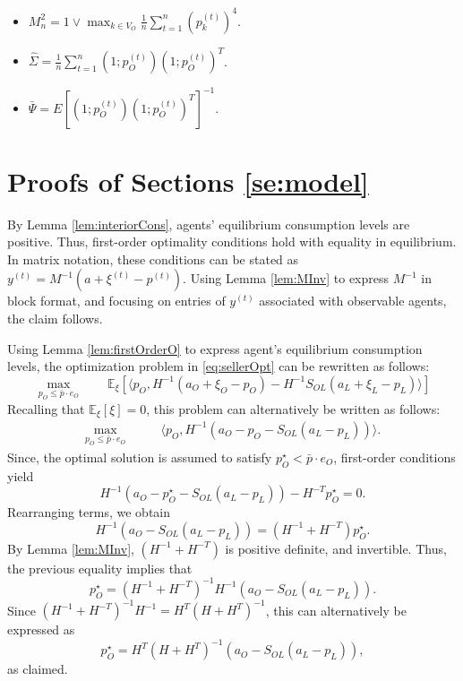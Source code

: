\documentclass[opre,nonblindrev]{informs3} %
\begin{document}
\begin{APPENDIX}{}
\begin{itemize}
    		\item 	$M_n^2= 1\vee \max_{k\in V_O}\frac{1}{n}\sum_{t=1}^n(p_k^{(t)})^4$.
    		
    		\item $\hat\Sigma= \frac{1}{n}\sum_{t=1}^n(1;p_O^{(t)})(1;p_O^{(t)})^T$.
    		
    		
    		\item $\bar \Psi=E[(1;p_O^{(t)})(1;p_O^{(t)})^T]^{-1}$.
    		
    	\end{itemize}
    	
    	
    	\section{Proofs of Sections \ref{se:model}} \label{app:proofs}
    By Lemma \ref{lem:interiorCons},
 agents' equilibrium consumption levels are positive. Thus,
 first-order optimality conditions hold  with equality in equilibrium. In matrix notation, these conditions can be stated as  ${y}^{(t)}=M^{-1}({a}+\xi^{(t)} - {p}^{(t)})$.
    Using Lemma \ref{lem:MInv} to express $M^{-1}$ in block format, and focusing on entries of ${y}^{(t)}$ associated with observable agents, the claim follows.
    \Halmos
    \endproof

Using Lemma \ref{lem:firstOrderO} to express agent's equilibrium consumption levels, the optimization problem in \eqref{eq:sellerOpt} can be rewritten as follows:
\[
      		\max_{ {p}_O \leq \bar{p} \cdot {e}_O} \qquad  \mathbb{E}_{\xi}[\langle {p}_O,
      		  H^{-1} ({a}_O+{\xi}_O  -{p}_O) -H^{-1} S_{OL} ({a}_L+{\xi}_L  -{p}_L)
      		 \rangle]
\]
      Recalling that $ \mathbb{E}_{\xi} [{\xi}]=0$, this problem can alternatively be written as follows:
      \begin{equation}\label{eq:sellerOptExp}
      \begin{aligned}
      \max_{ {p}_O \leq \bar{p} \cdot {e}_O} \qquad &  \langle {p}_O,
      H^{-1} ({a}_O -{p}_O - S_{OL} ({a}_L -{p}_L) )
      \rangle .
      \end{aligned}
      \end{equation}
      Since, the optimal solution is assumed to satisfy
      ${p}_O^\star < \bar{p} \cdot {e}_O$, first-order conditions yield
      \[
      H^{-1} ( {a}_O - {p}^\star_O - S_{OL} ( {a}_L - {p}_L)) -H^{-T}  {p}^\star_O=0.
      \]
      Rearranging terms, we obtain
\begin{equation} \label{eq:auxFOC}
      H^{-1} ( {a}_O  - S_{OL} ( {a}_L - {p}_L))=
       (H^{-1} + H^{-T})  {p}^\star_O.
\end{equation}
By Lemma \ref{lem:MInv}, $(H^{-1} + H^{-T})$ is positive definite, and invertible.
Thus, the previous equality implies that
      \[
 {p}^\star_O=       (H^{-1} + H^{-T})^{-1}H^{-1}(  {a}_O  - S_{OL} ( {a}_L - {p}_L))
        .
      \]
      Since $(H^{-1} + H^{-T})^{-1}H^{-1}= H^{T}(H+H^T)^{-1}$,
      this can alternatively be expressed as
      \[{p}^\star_O=      H^{T}(H+H^T)^{-1}( {a}_O  - S_{OL} ({a}_L -{p}_L)),\] as claimed.
\hfill      \Halmos
      \endproof




\end{APPENDIX}
\end{document}

